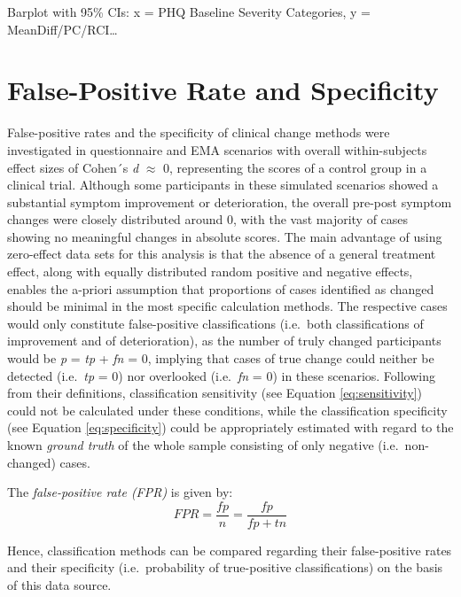 \documentclass[12pt,twoside]{reedthesis}
\begin{document}
Barplot with 95\% CIs: x = PHQ Baseline Severity Categories, y = MeanDiff/PC/RCI\ldots{}

\hypertarget{false-positive-rate-and-specificity}{%
\section{False-Positive Rate and Specificity}\label{false-positive-rate-and-specificity}}

False-positive rates and the specificity of clinical change methods were investigated in questionnaire and EMA scenarios with overall within-subjects effect sizes of Cohen´s \emph{d} \(\approx\) 0, representing the scores of a control group in a clinical trial. Although some participants in these simulated scenarios showed a substantial symptom improvement or deterioration, the overall pre-post symptom changes were closely distributed around 0, with the vast majority of cases showing no meaningful changes in absolute scores. The main advantage of using zero-effect data sets for this analysis is that the absence of a general treatment effect, along with equally distributed random positive and negative effects, enables the a-priori assumption that proportions of cases identified as changed should be minimal in the most specific calculation methods. The respective cases would only constitute false-positive classifications (i.e.~both classifications of improvement and of deterioration), as the number of truly changed participants would be \emph{p} = \emph{tp} + \emph{fn} = 0, implying that cases of true change could neither be detected (i.e.~\emph{tp} = 0) nor overlooked (i.e.~\emph{fn} = 0) in these scenarios. Following from their definitions, classification sensitivity (see Equation \eqref{eq:sensitivity}) could not be calculated under these conditions, while the classification specificity (see Equation \eqref{eq:specificity}) could be appropriately estimated with regard to the known \emph{ground truth} of the whole sample consisting of only negative (i.e.~non-changed) cases.

The \emph{false-positive rate (FPR)} is given by:
\begin{equation}
FPR = \frac{fp}{n} = \frac{fp}{fp + tn} \label{eq:fpr}
\end{equation}
\par

Hence, classification methods can be compared regarding their false-positive rates and their specificity (i.e.~probability of true-positive classifications) on the basis of this data source.
\end{document}
